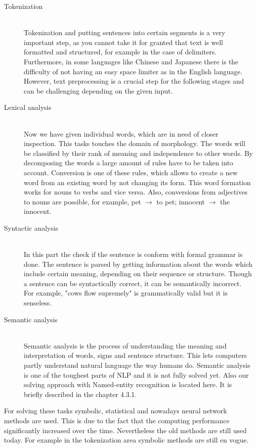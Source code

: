 \begin{description}

\item[Tokenization]\hfill \\
Tokenization and putting sentences into certain segments is a very important step, as you cannot take it for granted that text is well formatted and structured, for example in the case of delimiters. Furthermore, in some languages like Chinese and Japanese there is the difficulty of not having an easy space limiter as in the English language. However, text preprocessing is a crucial step for the following stages and can be challenging depending on the given input.

\item[Lexical analysis]\hfill \\
Now we have given individual words, which are in need of closer inspection. This tasks touches the domain of morphology. The words will be classified by their rank of meaning and independence to other words. By decomposing the words a large amount of rules have to be taken into account. Conversion is one of these rules, which allows to create a new word from an existing word by not changing its form. This word formation works for nouns to verbs and vice versa. Also, conversions from adjectives to nouns are possible, for example, pet $\rightarrow$ to pet; innocent $\rightarrow$ the innocent.

\item[Syntactic analysis]\hfill \\
In this part the check if the sentence is conform with formal grammar is done. The sentence is parsed by getting information about the words which include certain meaning, depending on their sequence or structure. Though a sentence can be syntactically correct, it can be semantically incorrect. For example, "cows flow supremely" is grammatically valid but it is senseless.

\item[Semantic analysis]\hfill \\
Semantic analysis is the process of understanding the meaning and interpretation of words, signs and sentence structure. This lets computers partly understand natural language the way humans do. Semantic analysis is one of the toughest parts of NLP and it is not fully solved yet. Also our solving approach with Named-entity recognition is located here. It is briefly described in the chapter 4.3.1.
\end{description}

For solving these tasks symbolic, statistical and nowadays neural network methods are used. This is due to the fact that the computing performance significantly increased over the time. Nevertheless the old methods are still used today. For example in the tokenization area symbolic methods are still en vogue.

